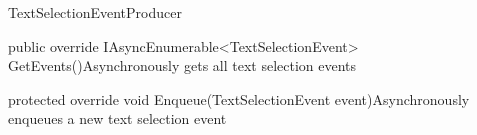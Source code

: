 \begin{class}{TextSelectionEventProducer} 
    


    \begin{methods}
        \begin{method}{public override IAsyncEnumerable<TextSelectionEvent> GetEvents()}{Asynchronously gets all text selection events}
        \end{method}
        \begin{method}{ protected override void Enqueue(TextSelectionEvent event)}{Asynchronously enqueues a new text selection event}
            \begin{parameters}
            \end{parameters}
        \end{method}
    \end{methods}
\end{class}

